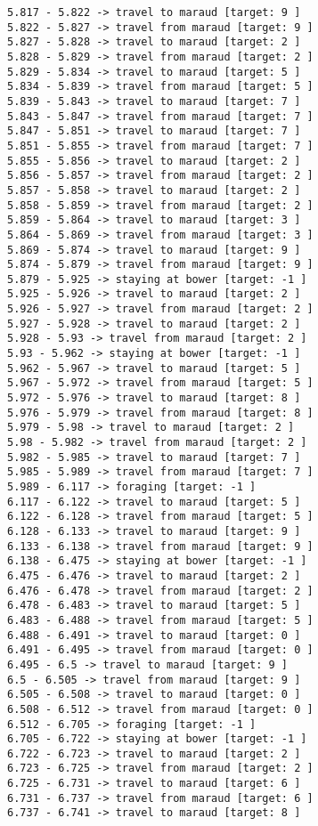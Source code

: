 \documentclass[11pt]{article}
\begin{document}
\begin{Verbatim}[commandchars=\\\{\}]
5.817 - 5.822 -> travel to maraud [target: 9 ]
5.822 - 5.827 -> travel from maraud [target: 9 ]
5.827 - 5.828 -> travel to maraud [target: 2 ]
5.828 - 5.829 -> travel from maraud [target: 2 ]
5.829 - 5.834 -> travel to maraud [target: 5 ]
5.834 - 5.839 -> travel from maraud [target: 5 ]
5.839 - 5.843 -> travel to maraud [target: 7 ]
5.843 - 5.847 -> travel from maraud [target: 7 ]
5.847 - 5.851 -> travel to maraud [target: 7 ]
5.851 - 5.855 -> travel from maraud [target: 7 ]
5.855 - 5.856 -> travel to maraud [target: 2 ]
5.856 - 5.857 -> travel from maraud [target: 2 ]
5.857 - 5.858 -> travel to maraud [target: 2 ]
5.858 - 5.859 -> travel from maraud [target: 2 ]
5.859 - 5.864 -> travel to maraud [target: 3 ]
5.864 - 5.869 -> travel from maraud [target: 3 ]
5.869 - 5.874 -> travel to maraud [target: 9 ]
5.874 - 5.879 -> travel from maraud [target: 9 ]
5.879 - 5.925 -> staying at bower [target: -1 ]
5.925 - 5.926 -> travel to maraud [target: 2 ]
5.926 - 5.927 -> travel from maraud [target: 2 ]
5.927 - 5.928 -> travel to maraud [target: 2 ]
5.928 - 5.93 -> travel from maraud [target: 2 ]
5.93 - 5.962 -> staying at bower [target: -1 ]
5.962 - 5.967 -> travel to maraud [target: 5 ]
5.967 - 5.972 -> travel from maraud [target: 5 ]
5.972 - 5.976 -> travel to maraud [target: 8 ]
5.976 - 5.979 -> travel from maraud [target: 8 ]
5.979 - 5.98 -> travel to maraud [target: 2 ]
5.98 - 5.982 -> travel from maraud [target: 2 ]
5.982 - 5.985 -> travel to maraud [target: 7 ]
5.985 - 5.989 -> travel from maraud [target: 7 ]
5.989 - 6.117 -> foraging [target: -1 ]
6.117 - 6.122 -> travel to maraud [target: 5 ]
6.122 - 6.128 -> travel from maraud [target: 5 ]
6.128 - 6.133 -> travel to maraud [target: 9 ]
6.133 - 6.138 -> travel from maraud [target: 9 ]
6.138 - 6.475 -> staying at bower [target: -1 ]
6.475 - 6.476 -> travel to maraud [target: 2 ]
6.476 - 6.478 -> travel from maraud [target: 2 ]
6.478 - 6.483 -> travel to maraud [target: 5 ]
6.483 - 6.488 -> travel from maraud [target: 5 ]
6.488 - 6.491 -> travel to maraud [target: 0 ]
6.491 - 6.495 -> travel from maraud [target: 0 ]
6.495 - 6.5 -> travel to maraud [target: 9 ]
6.5 - 6.505 -> travel from maraud [target: 9 ]
6.505 - 6.508 -> travel to maraud [target: 0 ]
6.508 - 6.512 -> travel from maraud [target: 0 ]
6.512 - 6.705 -> foraging [target: -1 ]
6.705 - 6.722 -> staying at bower [target: -1 ]
6.722 - 6.723 -> travel to maraud [target: 2 ]
6.723 - 6.725 -> travel from maraud [target: 2 ]
6.725 - 6.731 -> travel to maraud [target: 6 ]
6.731 - 6.737 -> travel from maraud [target: 6 ]
6.737 - 6.741 -> travel to maraud [target: 8 ]

\end{Verbatim}
\end{document}
